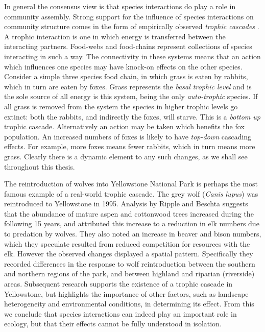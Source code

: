 In general the consensus view is that species interactions do play a role in community assembly. Strong support for the influence of species interactions on community structure comes in the form of empirically observed \emph{trophic cascades} \cite{knight2005trophic,ripple2012trophic}. A trophic interaction is one in which energy is transferred between the interacting partners. Food-webs and food-chains represent collections of species interacting in such a way. The connectivity in these systems means that an action which influences one species may have knock-on effects on the other species. Consider a simple three species food chain, in which grass is eaten by rabbits, which in turn are eaten by foxes. Grass represents the \emph{basal trophic level} and is the sole source of all energy is this system, being the only \emph{auto-trophic} species. If all grass is removed from the system the species in higher trophic levels go extinct: both the rabbits, and indirectly the foxes, will starve. This is a \emph{bottom up} trophic cascade. Alternatively an action may be taken which benefits the fox population. An increased numbers of foxes is likely to have \emph{top-down} cascading effects. For example, more foxes means fewer rabbits, which in turn means more grass. Clearly there is a dynamic element to any such changes, as we shall see throughout this thesis. 

The reintroduction of wolves into Yellowstone National Park is perhaps the most famous example of a real-world trophic cascade. The grey wolf (\emph{Canis lupus}) was reintroduced to Yellowstone in 1995. Analysis by Ripple and Beschta  \cite{ripple2012trophic} suggests that the abundance of mature aspen and cottonwood trees increased during the following 15 years, and attributed this increase to a reduction in elk numbers due to predation by wolves. They also noted an increase in beaver and bison numbers, which they speculate resulted from reduced competition for resources with the elk. However the observed changes displayed a spatial pattern. Specifically they recorded differences in the response to wolf reintroduction between the southern and northern regions of the park, and between highland and riparian (riverside) areas. Subsequent research \cite{marshall2014interactions} supports the existence of a trophic cascade in Yellowstone, but highlights the importance of other factors, such as landscape heterogeneity and environmental conditions, in determining its effect. From this we conclude that species interactions can indeed play an important role in ecology, but that their effects cannot be fully understood in isolation.


